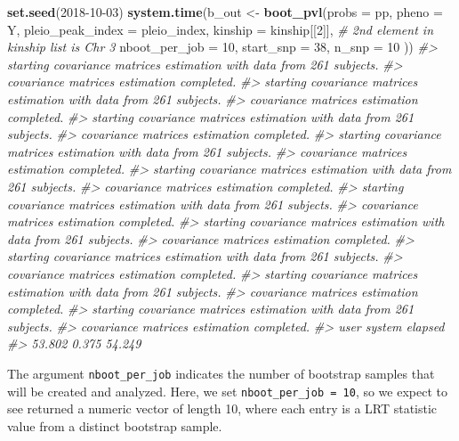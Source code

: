 \documentclass{book}
\newenvironment{Shaded}{\begin{snugshade}}{\end{snugshade}}
\newcommand{\CommentTok}[1]{\textcolor[rgb]{0.56,0.35,0.01}{\textit{#1}}}
\newcommand{\DataTypeTok}[1]{\textcolor[rgb]{0.13,0.29,0.53}{#1}}
\newcommand{\DecValTok}[1]{\textcolor[rgb]{0.00,0.00,0.81}{#1}}
\newcommand{\KeywordTok}[1]{\textcolor[rgb]{0.13,0.29,0.53}{\textbf{#1}}}
\newcommand{\NormalTok}[1]{#1}
\newcommand{\StringTok}[1]{\textcolor[rgb]{0.31,0.60,0.02}{#1}}
\begin{document}
\begin{Shaded}
\begin{Highlighting}[]
\KeywordTok{set.seed}\NormalTok{(}\DecValTok{2018-10-03}\NormalTok{)}
\KeywordTok{system.time}\NormalTok{(b_out <-}\StringTok{ }\KeywordTok{boot_pvl}\NormalTok{(}\DataTypeTok{probs =}\NormalTok{ pp,}
         \DataTypeTok{pheno =}\NormalTok{ Y, }
         \DataTypeTok{pleio_peak_index =}\NormalTok{ pleio_index, }
         \DataTypeTok{kinship =}\NormalTok{ kinship[[}\DecValTok{2}\NormalTok{]], }\CommentTok{# 2nd element in kinship list is Chr 3 }
         \DataTypeTok{nboot_per_job =} \DecValTok{10}\NormalTok{, }
         \DataTypeTok{start_snp =} \DecValTok{38}\NormalTok{, }
         \DataTypeTok{n_snp =} \DecValTok{10}
\NormalTok{         ))}
\CommentTok{#> starting covariance matrices estimation with data from 261 subjects.}
\CommentTok{#> covariance matrices estimation completed.}
\CommentTok{#> starting covariance matrices estimation with data from 261 subjects.}
\CommentTok{#> covariance matrices estimation completed.}
\CommentTok{#> starting covariance matrices estimation with data from 261 subjects.}
\CommentTok{#> covariance matrices estimation completed.}
\CommentTok{#> starting covariance matrices estimation with data from 261 subjects.}
\CommentTok{#> covariance matrices estimation completed.}
\CommentTok{#> starting covariance matrices estimation with data from 261 subjects.}
\CommentTok{#> covariance matrices estimation completed.}
\CommentTok{#> starting covariance matrices estimation with data from 261 subjects.}
\CommentTok{#> covariance matrices estimation completed.}
\CommentTok{#> starting covariance matrices estimation with data from 261 subjects.}
\CommentTok{#> covariance matrices estimation completed.}
\CommentTok{#> starting covariance matrices estimation with data from 261 subjects.}
\CommentTok{#> covariance matrices estimation completed.}
\CommentTok{#> starting covariance matrices estimation with data from 261 subjects.}
\CommentTok{#> covariance matrices estimation completed.}
\CommentTok{#> starting covariance matrices estimation with data from 261 subjects.}
\CommentTok{#> covariance matrices estimation completed.}
\CommentTok{#>    user  system elapsed }
\CommentTok{#>  53.802   0.375  54.249}
\end{Highlighting}
\end{Shaded}

The argument \texttt{nboot\_per\_job} indicates the number of bootstrap
samples that will be created and analyzed. Here, we set
\texttt{nboot\_per\_job\ =\ 10}, so we expect to see returned a numeric
vector of length 10, where each entry is a LRT statistic value from a
distinct bootstrap sample.
\end{document}
